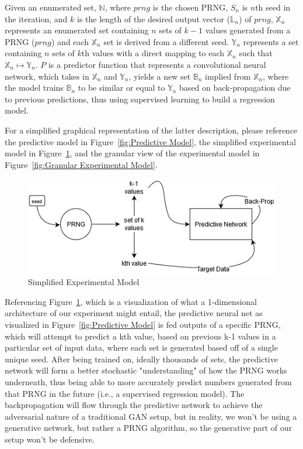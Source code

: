 \documentclass[conference]{IEEEtran}
\begin{document}
Given an enumerated set, $\mathbb{N}$,
where $prng$ is the chosen PRNG, $S_n$ is $n$th seed in the iteration, and $k$ is the length of the desired output vector ($\mathbb{L}_n$) of $prng$,
$\mathbb{X}_n$ represents an enumerated set containing $n$ sets of $k-1$ values generated from a PRNG ($prng$) and each $\mathbb{X}_n$ set is derived from a different seed. $\mathbb{Y}_n$ represents a set containing $n$ sets of $k$th values with a direct mapping to each $\mathbb{X}_n$ such that $\mathbb{X}_n \mapsto \mathbb{Y}_n$. $P$ is a predictor function that represents a convolutional neural network, which takes in $\mathbb{X}_n$ and $\mathbb{Y}_n$, yields a new set $\mathbb{B}_n$ implied from $\mathbb{X}_n$, where the model trains $\mathbb{B}_n$ to be similar or equal to $\mathbb{Y}_n$ based on back-propagation due to previous predictions, thus using supervised learning to build a regression model.

For a simplified graphical representation of the latter description, please reference the predictive model in Figure~\ref{fig:Predictive Model}, the simplified experimental model in Figure~\ref{fig:Simplified Experimental Model}, and the granular view of the experimental model in Figure~\ref{fig:Granular Experimental Model}.


\begin{figure}[H]
\centering
\includegraphics[width=1\linewidth]{./Images/SimpleModel.png}
\caption{Simplified Experimental Model}
\label{fig:Simplified Experimental Model}
\end{figure}

Referencing Figure~\ref{fig:Simplified Experimental Model}, which is a visualization of what a 1-dimensional architecture of our experiment might entail, the predictive neural net as visualized in Figure~\ref{fig:Predictive Model} is fed outputs of a specific PRNG, which will attempt to predict a kth value, based on previous k-1 values in a particular set of input data, where each set is generated based off of a single unique seed. After being trained on, ideally thousands of sets, the predictive network will form a better stochastic "understanding" of how the PRNG works underneath, thus being able to more accurately predict numbers generated from that PRNG in the future (i.e., a supervised regression model). The backpropagation will flow through the predictive network to achieve the adversarial nature of a traditional GAN setup, but in reality, we won't be using a generative network, but rather a PRNG algorithm, so the generative part of our setup won't be defensive.
\end{document}
